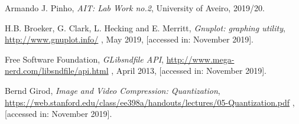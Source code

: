 \documentclass[12pt]{article}
\begin{document}
\begin{thebibliography}{9}
  

    Armando J. Pinho,
    \textit{AIT: Lab Work no.2},
    University of Aveiro,
    2019/20.
  
    H.B. Broeker, G. Clark, L. Hecking and E. Merritt,
    \textit{Gnuplot: graphing utility},
    \url{http://www.gnuplot.info/} ,
    May 2019,
    [accessed in: November 2019].

    Free Software Foundation,
    \textit{GLibsndfile API},
    \url{http://www.mega-nerd.com/libsndfile/api.html} ,
    April 2013,
    [accessed in: November 2019].

    Bernd Girod,
    \textit{Image and Video Compression: Quantization},
    \url{https://web.stanford.edu/class/ee398a/handouts/lectures/05-Quantization.pdf} ,
    [accessed in: November 2019].

    

\end{thebibliography}

\clearpage
\end{document}
